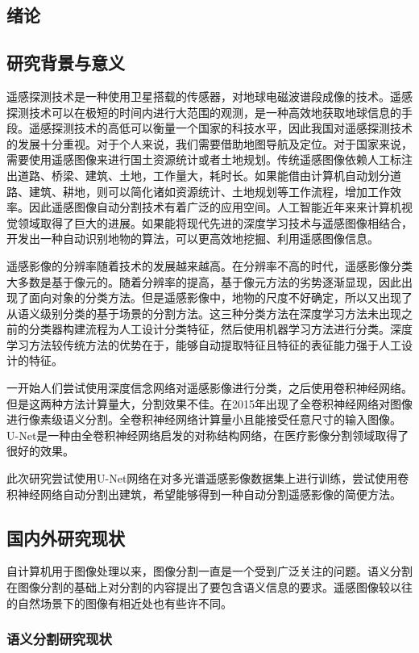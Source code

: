 \begin{spacing}{2}
    \section{绪论}
\end{spacing}
\subsection{研究背景与意义}
遥感探测技术是一种使用卫星搭载的传感器，对地球电磁波谱段成像的技术。遥感探测技术可以在极短的时间内进行大范围的观测，是一种高效地获取地球信息的手段。遥感探测技术的高低可以衡量一个国家的科技水平，因此我国对遥感探测技术的发展十分重视。对于个人来说，我们需要借助地图导航及定位。对于国家来说，需要使用遥感图像来进行国土资源统计或者土地规划。传统遥感图像依赖人工标注出道路、桥梁、建筑、土地，工作量大，耗时长。如果能借由计算机自动划分道路、建筑、耕地，则可以简化诸如资源统计、土地规划等工作流程，增加工作效率。因此遥感图像自动分割技术有着广泛的应用空间。人工智能近年来来计算机视觉领域取得了巨大的进展。如果能将现代先进的深度学习技术与遥感图像相结合，开发出一种自动识别地物的算法，可以更高效地挖掘、利用遥感图像信息。

遥感影像的分辨率随着技术的发展越来越高。在分辨率不高的时代，遥感影像分类大多数是基于像元的。随着分辨率的提高，基于像元方法的劣势逐渐显现，因此出现了面向对象的分类方法。但是遥感影像中，地物的尺度不好确定，所以又出现了从语义级别分类的基于场景的分割方法。这三种分类方法在深度学习方法未出现之前的分类器构建流程为人工设计分类特征，然后使用机器学习方法进行分类。深度学习方法较传统方法的优势在于，能够自动提取特征且特征的表征能力强于人工设计的特征。

一开始人们尝试使用深度信念网络对遥感影像进行分类，之后使用卷积神经网络。但是这两种方法计算量大，分割效果不佳。在2015年出现了全卷积神经网络对图像进行像素级语义分割。全卷积神经网络计算量小且能接受任意尺寸的输入图像。U-Net是一种由全卷积神经网络启发的对称结构网络，在医疗影像分割领域取得了很好的效果。

此次研究尝试使用U-Net网络在对多光谱遥感影像数据集上进行训练，尝试使用卷积神经网络自动分割出建筑，希望能够得到一种自动分割遥感影像的简便方法。
\subsection{国内外研究现状}
自计算机用于图像处理以来，图像分割一直是一个受到广泛关注的问题。语义分割在图像分割的基础上对分割的内容提出了要包含语义信息的要求。遥感图像较以往的自然场景下的图像有相近处也有些许不同。
\subsubsection{语义分割研究现状}


